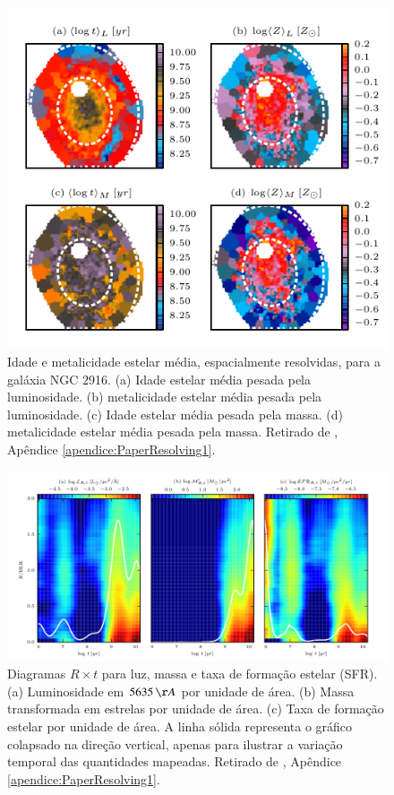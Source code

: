 \begin{figure}
	\includegraphics{figuras/at-aZ-K0277}
	\caption[Idade estelar e metalidade espacialmente resolvidas para a
	galáxia NGC 2916] {Idade e metalicidade estelar média, espacialmente
	resolvidas, para a galáxia NGC 2916. (a) Idade estelar média pesada pela
	luminosidade. (b) metalicidade estelar média pesada pela luminosidade.
	(c) Idade estelar média pesada pela massa. (d) metalicidade estelar
	média pesada pela massa. Retirado de
	\cite[figura 6]{CidFernandes2013a}, Apêndice \ref{apendice:PaperResolving1}.}
	\label{fig:ataZMap}
\end{figure}

\begin{figure}
	\includegraphics[width=1.0\columnwidth]{figuras/L-M-SFR-K0277}
	\caption[Diagramas $R \times t$ para luz, massa e SFR] {Diagramas $R \times t$
	para luz, massa e taxa de formação estelar (SFR). (a) Luminosidade em
	$5635\,\AA$ por unidade de área.  (b) Massa transformada em estrelas por
	unidade de área. (c) Taxa de formação estelar por unidade de área. A linha
	sólida representa o gráfico colapsado na direção vertical, apenas para ilustrar
	a variação temporal das quantidades mapeadas. Retirado de
	\cite[figura 12]{CidFernandes2013a}, Apêndice \ref{apendice:PaperResolving1}.}
	\label{fig:LMSFR2D}
\end{figure}

